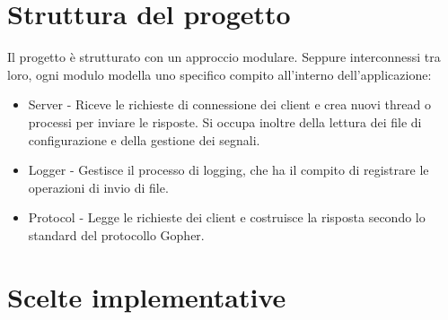 \documentclass{article}
\begin{document}
\tableofcontents

\section{Struttura del progetto}

Il progetto è strutturato con un approccio modulare. 
Seppure interconnessi tra loro, ogni modulo modella uno specifico compito all'interno dell'applicazione:
\begin{itemize}
    \item Server - Riceve le richieste di connessione dei client e crea nuovi thread 
    o processi per inviare le risposte. Si occupa inoltre della lettura dei file di configurazione e 
    della gestione dei segnali.
    \item Logger - Gestisce il processo di logging, che ha il compito di registrare le operazioni di invio
    di file.
    \item Protocol - Legge le richieste dei client e costruisce la risposta secondo lo standard del
    protocollo Gopher.
\end{itemize} 


\section{Scelte implementative}
\end{document}

